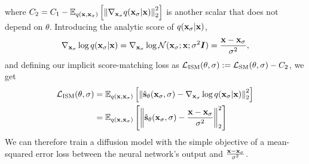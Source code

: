 where $C_2 = C_1 - \mathbb{E}_{q({\mathbf{x}}, {\mathbf{x}}_\sigma)}\left[ \left\| \nabla_{{\mathbf{x}}_\sigma} q({\mathbf{x}}_\sigma|{\mathbf{x}}) \right\|_2^2 \right]$ is another scalar that does not depend on $\theta$. Introducing the analytic score of $q({\mathbf{x}}_\sigma|{\mathbf{x}})$,
\begin{equation}
    \nabla_{{\mathbf{x}}_\sigma} \log q({\mathbf{x}}_\sigma|{\mathbf{x}}) = \nabla_{{\mathbf{x}}_\sigma} \log {\mathcal{N}}({\mathbf{x}}_\sigma; {\mathbf{x}}; \sigma^2{\bm{I}}) = \frac{{\mathbf{x}}-{\mathbf{x}}_\sigma}{\sigma^2},
\end{equation}
and defining our implicit score-matching loss as ${\mathcal{L}}_\text{ISM}(\theta, \sigma) := {\mathcal{L}}_\text{SM}(\theta, \sigma) - C_2$, we get
\begin{align} \label{eq:ism-loss}
    {\mathcal{L}}_\text{ISM}(\theta, \sigma) &= \mathbb{E}_{q({\mathbf{x}}, {\mathbf{x}}_\sigma)} \left[ 
    \left\| \hat{{\mathbf{s}}}_\theta({\mathbf{x}}_\sigma, \sigma) - \nabla_{{\mathbf{x}}_\sigma} \log q({\mathbf{x}}_\sigma|{\mathbf{x}}) \right\|_2^2 \right] \\
    &= \mathbb{E}_{q({\mathbf{x}}, {\mathbf{x}}_\sigma)} \left[  \label{eq:ism-loss-ve}
    \left\| \hat{{\mathbf{s}}}_\theta({\mathbf{x}}_\sigma, \sigma) - \frac{{\mathbf{x}}-{\mathbf{x}}_\sigma}{\sigma^2} \right\|_2^2 \right]
\end{align}
We can therefore train a diffusion model with the simple objective of a mean-squared error loss between the neural network's output and $\frac{{\mathbf{x}}-{\mathbf{x}}_\sigma}{\sigma^2}$.

